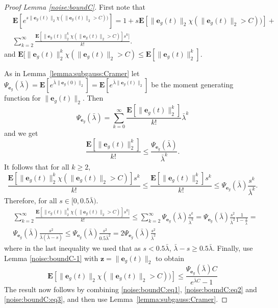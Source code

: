\documentclass{article}
\def\rve{{\mathbf{e}}}
\newcommand{\e}{\mathbf{e}}
\newcommand{\z}{\mathbf{z}}
\newcommand{\bE}{\mathbf{E}}
\begin{document}
\begin{proof}[Proof Lemma \ref{noise:boundC}]
   First note that 
   \begin{equation}
     \label{noise:boundC:eq1}
     \begin{aligned}
     & \bE[e^{s \|\e_g(t) \|_2 \chi(\|\e_g(t)\|_2 > C))}] =  1 + s  \bE[\|\e_g(t)\|
     _2\chi(\|\e_g(t)\|_2 > C))] + \\
      & \sum_{k=2}^{\infty} \frac{\bE[\|\e_g(t)\|_2^k \chi(\|\e_g(t)\|_2 > C)] s^k]}{k!}.
     \end{aligned}
    \end{equation}
and $\bE[\|\e_g(t)\|_2^k \chi(\|\e_g(t)\|_2 > C) \le \bE[\|\e_g(t)\|_2^k]$.

As in Lemma~\ref{lemma:subgauss:Cramer} let $\Psi_{\rve_g}(\bar{\lambda})=
\bE[e^{\bar{\lambda}\|\e_g(0)\|_2}]=
\bE[e^{\bar{\lambda}\|\e_g(t)\|_2}]$ be the moment generating function for $\|\e_g(t)\|_2$. Then
\[ 
\Psi_{\rve_g}(\bar{\lambda})
=\sum_{k=0}^{\infty} \frac{\bE[\|\e_g(t)\|_2^k]}{k!} 
\bar{\lambda}^k
\]
and we get 
\[
    \frac{\bE[\|\e_g(t)\|_2^k]}{k!} \le \frac{\Psi_{\rve_g}(\bar{\lambda})}{\bar{\lambda}^k}.
\]
It follows that for all $k \ge 2$,
\[
   \frac{\bE[\|\e_g(t)\|_2^k \chi(\|\e_g(t)\|_2 > C)]s^k}{k!} \le 
   \frac{\bE[\|\e_g(t)\|_2^k]s^k}{k!} \le  
   \Psi_{\rve_g}(\bar{\lambda})\frac{s^k}{\bar{\lambda}^k}.
\]
Therefore, for all $s \in [0,0.5\bar{\lambda})$. 
\begin{equation}
\label{noise:boundC:eq2}
  \begin{aligned}
     & \sum_{k=2}^{\infty} \frac{\bE[\|e_g(t)\|_2^k \chi(\|\e_g(t)\|_2 > C)] s^k]}{k!} \le 
      \sum_{k=2}^{\infty}  \Psi_{\rve_g}(\bar{\lambda})\frac{s^k}{\bar{\lambda}^k}=
     \Psi_{\rve_g}(\bar{\lambda}) \frac{s^2}{\bar{\lambda}^2} \frac{1}{1-\frac{s}{\bar{\lambda}}} 
     = \\
     & \Psi_{\rve_g}(\bar{\lambda}) \frac{s^2}{\bar{\lambda} (\bar{\lambda}-s)} \le 
     \Psi_{\rve_g}(\bar{\lambda}) \frac{s^2}{0.5 \bar{\lambda}^2}=
     2\Psi_{\rve_g}(\bar{\lambda}) \frac{s^2}{\bar{\lambda}^2} 
  \end{aligned}
\end{equation}
where in the last inequality we used that as $s < 0.5\bar{\lambda}$,
$\bar{\lambda}-s \ge 0.5\bar{\lambda}$.
Finally, use Lemma \ref{noise:boundC-1} with $\z=\|\e_g(t)\|_2$ to obtain
 \begin{equation}
 \label{noise:boundC:eq3}
 \bE[\|\e_g(t)\|_2\chi(\|\e_g(t)\|_2 > C))]
 \le \frac{\Psi_{\rve_g}(\bar{\lambda}) C}{e^{\bar{\lambda}C}-1} 
  \end{equation}
The result now follows by combining \eqref{noise:boundC:eq1}, \eqref{noise:boundC:eq2} and 
\eqref{noise:boundC:eq3}, and then use Lemma~\ref{lemma:subgauss:Cramer}. 
\end{proof}
\end{document}
